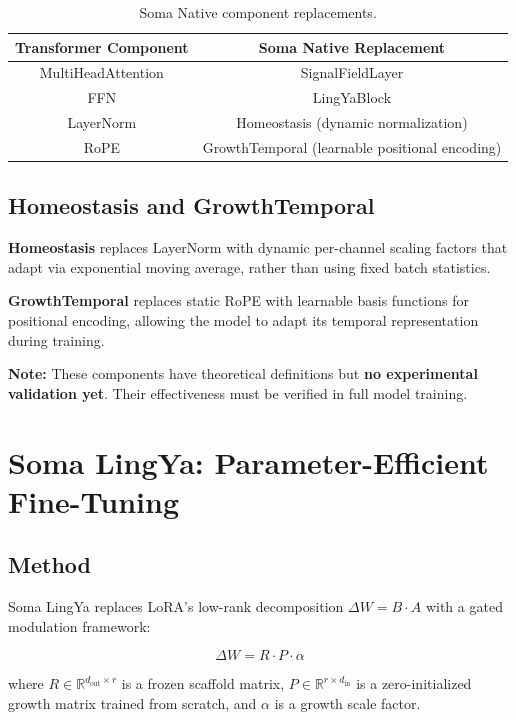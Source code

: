 \documentclass[11pt]{article}
\begin{document}
\begin{table}[h]
\centering
\begin{tabular}{cc}
\toprule
Transformer Component & Soma Native Replacement \\
\midrule
MultiHeadAttention & SignalFieldLayer \\
FFN & LingYaBlock \\
LayerNorm & Homeostasis (dynamic normalization) \\
RoPE & GrowthTemporal (learnable positional encoding) \\
\bottomrule
\end{tabular}
\caption{Soma Native component replacements.}
\end{table}

\subsection{Homeostasis and GrowthTemporal}

\textbf{Homeostasis} replaces LayerNorm with dynamic per-channel scaling factors that adapt via exponential moving average, rather than using fixed batch statistics.

\textbf{GrowthTemporal} replaces static RoPE with learnable basis functions for positional encoding, allowing the model to adapt its temporal representation during training.

\noindent\textbf{Note:} These components have theoretical definitions but \textbf{no experimental validation yet}. Their effectiveness must be verified in full model training.

\section{Soma LingYa: Parameter-Efficient Fine-Tuning}

\subsection{Method}

Soma LingYa replaces LoRA's low-rank decomposition $\Delta W = B \cdot A$ with a gated modulation framework:

\begin{equation}
\Delta W = R \cdot P \cdot \alpha
\end{equation}

where $R \in \mathbb{R}^{d_{\text{out}} \times r}$ is a frozen scaffold matrix, $P \in \mathbb{R}^{r \times d_{\text{in}}}$ is a zero-initialized growth matrix trained from scratch, and $\alpha$ is a growth scale factor.
\end{document}
